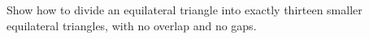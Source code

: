Show how to divide an equilateral triangle into exactly thirteen smaller equilateral triangles, with no overlap and no gaps.
